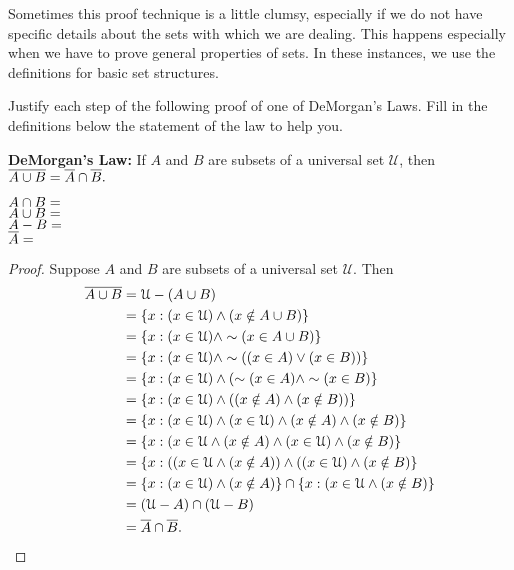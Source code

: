 \noindent  Sometimes this proof technique is a little clumsy, especially if we do not have specific details about the sets with which we are dealing.  This happens especially when we have to prove general properties of sets.  In these instances, we use the definitions for basic set structures.\\

\begin{question}[resume]

\item Justify each step of the following proof of one of DeMorgan's Laws.  Fill in the definitions below the statement of the law to help you.

\noindent \textbf{DeMorgan's Law:}  If $A$ and $B$ are subsets of a universal set $\mathcal{U}$, then $\overline{A \cup B} = \overline{A} \cap \overline{B}.$\\
\begin{mdframed}
$\displaystyle A \cap B = $ \\[.5in]

$\displaystyle A \cup B = $ \\[.5in]

$\displaystyle A - B = $\\[.5in]

$\overline{A} = $
\vspace{4in}
\begin{proof}  Suppose $A$ and $B$ are subsets of a universal set $\mathcal{U}$.  Then
\begingroup
\addtolength{\jot}{2.5em}
	\begin{align*}
	\overline{A \cup B} &= \mathcal{U} - (A \cup B) \\
	\ &= \left\{x: (x \in \mathcal{U}) \wedge (x \notin A \cup B)\right\}\\
	\ &= \left\{x: (x \in \mathcal{U}) \wedge \sim (x \in A \cup B)\right\}\\
	\ &= \left\{x: (x \in \mathcal{U}) \wedge \sim ( (x \in A) \vee (x \in B))\right\}\\
	\ &= \left\{x: (x \in \mathcal{U}) \wedge (\sim (x \in A) \wedge \sim (x \in B)\right\}\\
	\ &= \left\{x: (x \in \mathcal{U}) \wedge ((x \notin A) \wedge (x \notin B))\right\}\\
	\ &= \left\{x: (x \in \mathcal{U}) \wedge (x \in \mathcal{U}) \wedge (x \notin A) \wedge (x \notin B)\right\}\\
	\ &= \left\{x: (x \in \mathcal{U} \wedge (x \notin A) \wedge (x \in \mathcal{U}) \wedge (x \notin B)\right\}\\
	\ &= \left\{x: ((x \in \mathcal{U} \wedge (x \notin A)) \wedge ((x \in \mathcal{U}) \wedge (x \notin B)\right\}\\
	\ &= \left\{x: (x\in \mathcal{U}) \wedge (x \notin A)\right\} \cap \left\{x : (x \in \mathcal{U} \wedge (x \notin B)\right\}\\
	\ &= (\mathcal{U}-A) \cap (\mathcal{U}-B)\\
	\ &= \overline{A} \cap \overline{B}.
	\end{align*}
	\endgroup
\end{proof}
\end{mdframed}
\end{question}






